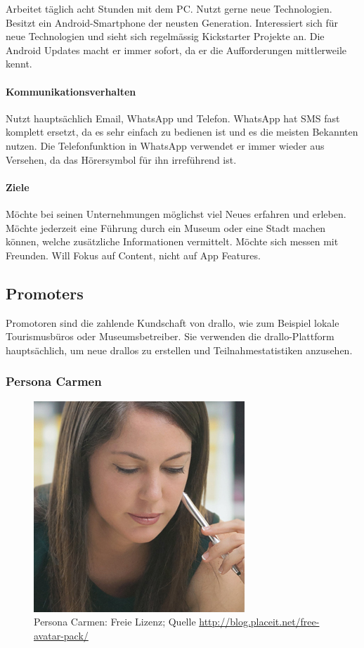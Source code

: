 Arbeitet täglich acht Stunden mit dem PC. Nutzt gerne neue Technologien. Besitzt ein Android-Smartphone der neusten Generation. Interessiert sich für neue Technologien und sieht sich regelmässig Kickstarter Projekte an. Die Android Updates macht er immer sofort, da er die Aufforderungen mittlerweile kennt.\\

\paragraph{Kommunikationsverhalten }

Nutzt hauptsächlich Email, WhatsApp und Telefon. WhatsApp hat SMS fast komplett ersetzt, da es sehr einfach zu bedienen ist und es die meisten Bekannten nutzen. Die Telefonfunktion in WhatsApp verwendet er immer wieder aus Versehen, da das Hörersymbol für ihn irreführend ist.\\ 

\paragraph{Ziele} 

Möchte bei seinen Unternehmungen möglichst viel Neues erfahren und erleben. Möchte jederzeit eine Führung durch ein Museum oder eine Stadt machen können, welche zusätzliche Informationen vermittelt. Möchte sich messen mit Freunden. Will Fokus auf Content, nicht auf App Features.\\

\subsection{Promoters}

Promotoren sind die zahlende Kundschaft von drallo, wie zum Beispiel lokale Tourismusbüros oder Museumsbetreiber. Sie verwenden die drallo-Plattform hauptsächlich, um neue drallos zu erstellen und Teilnahmestatistiken anzusehen.

\subsubsection{Persona Carmen}
\begin{figure}
	\includegraphics[width=.35\textwidth]{images/persona-carmen.jpg} 
	\caption{Persona Carmen: Freie Lizenz; Quelle \url{http://blog.placeit.net/free-avatar-pack/}}
	\label{fig:carmen}
\end{figure}


